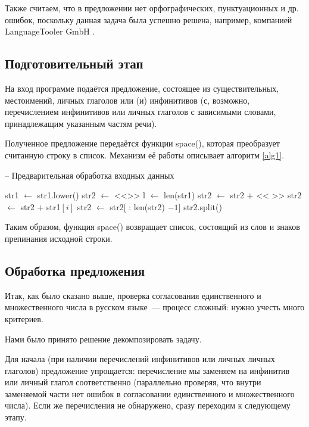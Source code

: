 \documentclass[main]{subfiles}
\begin{document}
Также считаем, что в предложении нет орфографических, пунктуационных и др. ошибок, поскольку данная задача была успешно решена, например, компанией LanguageTooler GmbH \cite{langt}.

\subsection{Подготовительный этап}
На вход программе подаётся предложение, состоящее из существительных, местоимений, личных глаголов или (и) инфинитивов (с, возможно, перечислением инфинитивов или личных глаголов с зависимыми словами, принадлежащим указанным частям речи). 

Полученное предложение передаётся функции space(), которая преобразует считанную строку в список. Механизм её работы описывает алгоритм \ref{alg1}.

\begin{algorithm}
	\caption{-- Предварительная обработка входных данных}\label{alg1}
	\begin{algorithmic}[1]
		\State str1 $\gets$ str1.lower() 
		\State str2 $\gets $ <<>> 
		\State l $\gets$ len(str1)
		\State str2 $\gets$ str2 $+$ << >>
		\EndIf
		\State str2 $\gets$ str2 $+$ str1$[i]$
		\EndFor
		\State str2 $\gets$ str2[ : len(str2) $- 1$] 
		\EndIf
		\State\Return str2.split() 
		\EndFunction
	\end{algorithmic}
\end{algorithm}

Таким образом, функция space() возвращает список, состоящий из слов и знаков препинания исходной строки.

\subsection{Обработка предложения}

Итак, как было сказано выше, проверка согласования единственного и множественного числа в русском языке~--- процесс сложный: нужно учесть много критериев. 

Нами было принято решение декомпозировать задачу. 

Для начала (при наличии перечислений инфинитивов или личных личных глаголов) предложение упрощается: перечисление мы заменяем на инфинитив или личный глагол соответственно (параллельно проверяя, что внутри заменяемой части нет ошибок в согласовании единственного и множественного числа). Если же перечисления не обнаружено, сразу переходим к следующему этапу.
\end{document}
